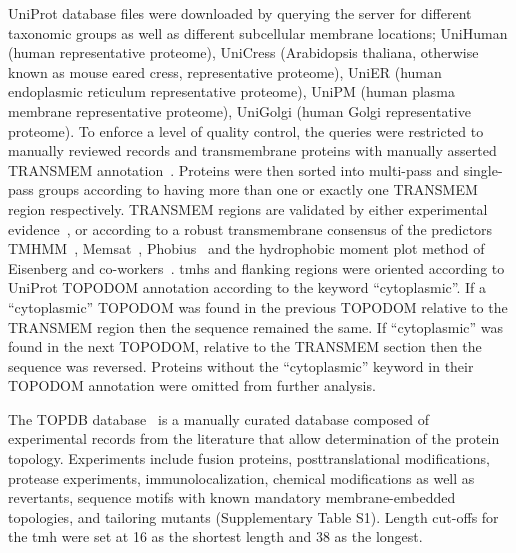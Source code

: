 UniProt database files were downloaded by querying the server for different taxonomic groups as well as different subcellular membrane locations; UniHuman (human representative proteome), UniCress (Arabidopsis thaliana, otherwise known as mouse eared cress, representative proteome), UniER (human endoplasmic reticulum representative proteome), UniPM (human plasma membrane representative proteome), UniGolgi (human Golgi representative proteome). To enforce a level of quality control, the queries were restricted to manually reviewed records and transmembrane proteins with manually asserted TRANSMEM annotation~\cite{TheUniProtConsortium2014}. Proteins were then sorted into multi-pass and single-pass groups according to having more than one or exactly one TRANSMEM region respectively. TRANSMEM regions are validated by either experimental evidence~\cite{TheUniProtConsortium2014}, or according to a robust transmembrane consensus of the predictors TMHMM~\cite{Krogh2001}, Memsat~\cite{Jones2007}, Phobius~\cite{Kall2004,Kall2007} and the hydrophobic moment plot method of Eisenberg and co-workers~\cite{Eisenberg1984}. \gls{tmh}s and flanking regions were oriented according to UniProt TOPO\textunderscore DOM annotation according to the keyword ``cytoplasmic''. If a ``cytoplasmic'' TOPO\textunderscore DOM was found in the previous TOPO\textunderscore DOM relative to the TRANSMEM region then the sequence remained the same. If ``cytoplasmic'' was found in the next TOPO\textunderscore DOM, relative to the TRANSMEM section then the sequence was reversed. Proteins without the ``cytoplasmic'' keyword in their TOPO\textunderscore DOM annotation were omitted from further analysis.

The TOPDB database~\cite{Dobson2015} is a manually curated database composed of experimental records from the literature that allow determination of the protein topology. Experiments include fusion proteins, posttranslational modifications, protease experiments, immunolocalization, chemical modifications as well as revertants, sequence motifs with known mandatory membrane-embedded topologies, and tailoring mutants (Supplementary Table S1). Length cut-offs for the \gls{tmh} were set at 16 as the shortest length and 38 as the longest.

